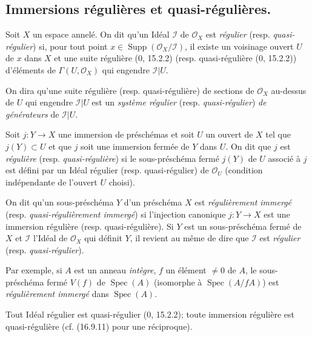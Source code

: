 \subsection{Immersions régulières et quasi-régulières.}

\begin{definition}[16.9.1]
Soit $X$ un espace annelé. On dit qu'un Idéal $\mathscr{I}$ de
$\mathcal{O}_X$ est \emph{régulier} (resp. \emph{quasi-régulier}) si, pour
tout point $x\in\operatorname{Supp}(\mathcal{O}_X/\mathscr{I})$, il existe un
voisinage ouvert $U$ de $x$ dans $X$ et une suite régulière (0, 15.2.2) (resp.
quasi-régulière (0, 15.2.2)) d'éléments de $\Gamma(U,\mathcal{O}_X)$ qui
engendre $\mathscr{I}|U$.
\end{definition}

On dira qu'une suite régulière (resp. quasi-régulière) de sections de
$\mathcal{O}_X$ au-dessus de $U$ qui engendre $\mathscr{I}|U$ est un
\emph{système régulier} (resp. \emph{quasi-régulier}) \emph{de générateurs}
de $\mathscr{I}|U$.

\begin{definition}[16.9.2]
Soit $j:Y\to X$ une immersion de préschémas et soit $U$ un ouvert de $X$ tel
que $j(Y)\subset U$ et que $j$ soit une immersion fermée de $Y$ dans $U$. On
dit que $j$ est \emph{régulière} (resp. \emph{quasi-régulière}) si le
sous-préschéma fermé $j(Y)$ de $U$ associé à $j$ est défini par un Idéal
régulier (resp. quasi-régulier) de $\mathcal{O}_U$ (condition indépendante de
l'ouvert $U$ choisi).
\end{definition}

On dit qu'un sous-préschéma $Y$ d'un préschéma $X$ est \emph{régulièrement
immergé} (resp. \emph{quasi-régulièrement immergé}) si l'injection canonique
$j:Y\to X$ est une immersion régulière (resp. quasi-régulière). Si $Y$ est un
sous-préschéma fermé de $X$ et $\mathscr{I}$ l'Idéal de $\mathcal{O}_X$ qui
définit $Y$, il revient au même de dire que $\mathscr{I}$ est \emph{régulier}
(resp. \emph{quasi-régulier}).

Par exemple, si $A$ est un anneau \emph{intègre}, $f$ un élément $\neq0$ de
$A$, le sous-préschéma fermé $V(f)$ de $\operatorname{Spec}(A)$ (isomorphe à
$\operatorname{Spec}(A/fA)$) est \emph{régulièrement immergé} dans
$\operatorname{Spec}(A)$.

Tout Idéal régulier est quasi-régulier (0, 15.2.2); toute immersion régulière
est quasi-régulière (cf. (16.9.11) pour une réciproque).

